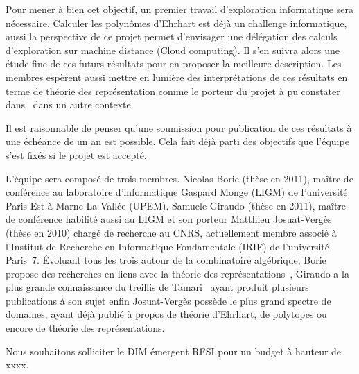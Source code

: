 \documentclass[a4paper, 10pt]{article}
\numberwithin{equation}{subsection}
\begin{document}
Pour mener à bien cet objectif, un premier travail d'exploration
informatique sera nécessaire. Calculer les polynômes d'Ehrhart est
déjà un challenge informatique, aussi la perspective de ce projet
permet d'envisager une délégation des calculs d'exploration sur
machine distance (Cloud computing). Il s'en suivra alors une étude
fine de ces futurs résultats pour en proposer la meilleure
description. Les membres espèrent aussi mettre en lumière des
interprétations de ces résultats en terme de théorie des
représentation comme le porteur du projet à pu constater
dans~\cite{MR3484760} dans un autre contexte.



Il est raisonnable de penser qu'une soumission pour publication de ces
résultats à une échéance de un an est possible. Cela fait déjà parti
des objectifs que l'équipe s'est fixés si le projet est accepté.



L'équipe sera composé de trois membres. Nicolas Borie (thèse en 2011),
maître de conférence au laboratoire d'informatique Gaspard Monge
(LIGM) de l'université Paris Est à Marne-La-Vallée (UPEM). Samuele
Giraudo (thèse en 2011), maître de conférence habilité aussi au LIGM
et son porteur Matthieu Josuat-Vergès (thèse en 2010) chargé de    %
recherche au CNRS, actuellement membre associé à l'Institut de
Recherche en Informatique Fondamentale (IRIF) de l'université Paris~7.
Évoluant tous les trois autour de la combinatoire algébrique, Borie  %
propose des recherches en liens avec la théorie des
représentations~\cite{MR3448031}, Giraudo a la plus grande
connaissance du treillis de Tamari~\cite{MR2887627} ayant produit
plusieurs publications à son sujet enfin Josuat-Vergès possède le plus
grand spectre de domaines, ayant déjà publié à propos de théorie
d'Ehrhart, de polytopes ou encore de théorie des représentations.



Nous souhaitons solliciter le DIM émergent RFSI pour un budget à hauteur de xxxx.


\end{document}
